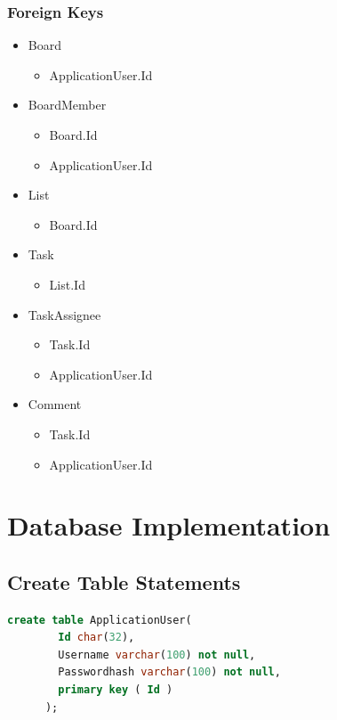 \documentclass[letterpaper]{article}
\begin{document}
\subsubsection{Foreign Keys}
\begin{itemize}
  \item Board
  \begin{itemize}
    \item ApplicationUser.Id
  \end{itemize}
  \item BoardMember
    \begin{itemize}
      \item Board.Id
      \item ApplicationUser.Id
    \end{itemize}
  \item List
    \begin{itemize}
      \item Board.Id
    \end{itemize}
  \item Task
    \begin{itemize}
      \item List.Id
    \end{itemize}
  \item TaskAssignee
    \begin{itemize}
      \item Task.Id
      \item ApplicationUser.Id
    \end{itemize}
  \item Comment
    \begin{itemize}
      \item Task.Id
      \item ApplicationUser.Id
    \end{itemize}
\end{itemize}
\pagebreak

\section{Database Implementation}

\subsection{Create Table Statements}
    \begin{lstlisting}[language=SQL, caption=ApplicationUser Table Creation Statement]
      create table ApplicationUser(
        Id char(32),
        Username varchar(100) not null,
        Passwordhash varchar(100) not null,
        primary key ( Id )
      );
    \end{lstlisting}
\end{document}

